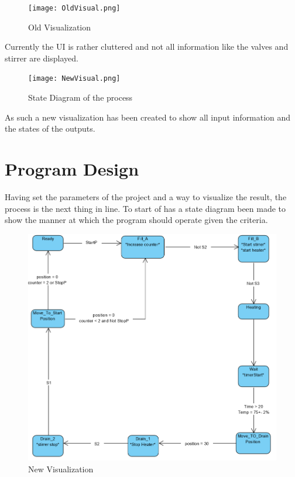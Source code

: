 \documentclass[11pt]{essayStyle} %
\begin{document}
\begin{figure}[h]
	\texttt{[image: OldVisual.png]}
	\caption{Old Visualization}
\end{figure}

Currently the UI is rather cluttered and not all information like the valves and stirrer are displayed. 

\begin{figure}[h]
	\texttt{[image: NewVisual.png]}
	\caption{State Diagram of the process}
\end{figure}

As such a new visualization has been created to show all input information and the states of the outputs. 


\section{Program Design}

Having set the parameters of the project and a way to visualize the result, the process is the next thing in line. To start of has a state diagram been made to show the manner at which the program should operate given the criteria.

\begin{figure}[h]
	\includegraphics[width=\linewidth]{StateDiagram.png}
	\caption{New Visualization}
\end{figure}
\end{document}
